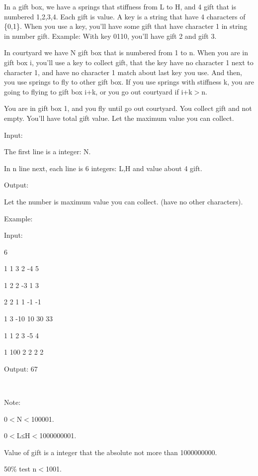 



In a gift box, we have a springs that stiffness from L to H, and 4 gift that is numbered 1,2,3,4. Each gift is value. A key is a string that have 4 characters of \{0,1\}. When you use a key, you’ll have some gift that have character 1 in string in number gift. Example: With key 0110, you’ll have gift 2 and gift 3.

In courtyard we have N gift box that is numbered from 1 to n. When you are in gift box i, you’ll use a key to collect gift, that the key have no character 1 next to character 1, and have no character 1 match about last key you use. And then, you use springs to fly to other gift box. If you use springs with stiffness k, you are going to flying to gift box i+k, or you go out courtyard if i+k$>$n.

You are in gift box 1, and you fly until go out courtyard. You collect gift and not empty. You’ll have total gift value. Let the maximum value you can collect.

Input:

The first line is a integer: N.

In n line next, each line is 6 integers: L,H and value about 4 gift.


Output: 

Let the number is maximum value you can collect. (have no other characters).


Example:




Input:

6

1 1 3 2 -4 5

1 2 2 -3 1 3

2 2 1 1 -1 -1

1 3 -10 10 30 33

1 1 2 3 -5 4

1 100 2 2 2 2




Output: 67

 

Note:

0$<$N$<$100001.

0$<$L≤H$<$1000000001.

Value of gift is a integer that the absolute not more than 1000000000.

50\% test n$<$1001.

 
